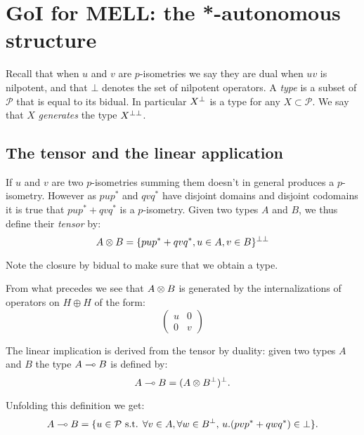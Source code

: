 \section{GoI for MELL: the *-autonomous structure}\label{goi-for-mell-the--autonomous-structure}

Recall that when \(u\) and \(v\) are \(p\)-isometries we say they are
dual when \(uv\) is nilpotent, and that \(\bot\) denotes the set of
nilpotent operators. A \emph{type} is a subset of \(\mathcal{P}\) that
is equal to its bidual. In particular \(X^\bot\) is a type for any
\(X\subset\mathcal{P}\). We say that \(X\) \emph{generates} the type
\(X^{\bot\bot}\).

\subsection{The tensor and the linear application}\label{the-tensor-and-the-linear-application}

If \(u\) and \(v\) are two \(p\)-isometries summing them doesn't in
general produces a \(p\)-isometry. However as \(pup^*\) and \(qvq^*\)
have disjoint domains and disjoint codomains it is true that
\(pup^* + qvq^*\) is a \(p\)-isometry. Given two types \(A\) and \(B\),
we thus define their \emph{tensor} by:
\begin{equation*}
A\otimes B = \{pup^* + qvq^*, u\in A, v\in B\}^{\bot\bot}
\end{equation*}

Note the closure by bidual to make sure that we obtain a type.

From what precedes we see that \(A\otimes B\) is generated by the
internalizations of operators on \(H\oplus H\) of the form:
\begin{equation*}
\begin{pmatrix}
  u & 0 \\
  0 & v
\end{pmatrix}
\end{equation*}

The linear implication is derived from the tensor by duality: given two
types \(A\) and \(B\) the type \(A\multimap B\) is defined by:
\begin{equation*}
A\multimap B = (A\otimes B^\bot)^\bot.
\end{equation*}

Unfolding this definition we get:
\begin{equation*}
A\multimap B = \{u\in\mathcal{P}\text{ s.t. } \forall v\in A, \forall w\in B^\bot,\, u.(pvp^* + qwq^*) \in\bot\}.
\end{equation*}

